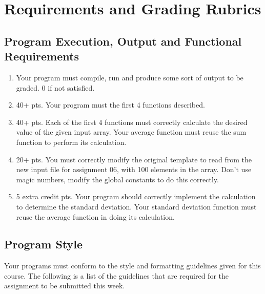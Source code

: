 \documentclass[11pt]{article}
\begin{document}
\section*{Requirements and Grading Rubrics}
\label{sec-5}

\subsection*{Program Execution, Output and Functional Requirements}
\label{sec-5-1}

\begin{enumerate}
\item Your program must compile, run and produce some sort of output to be
graded. 0 if not satisfied.
\item 40+ pts.  Your program must the first 4 functions described.
\item 40+ pts. Each of the first 4 functions must correctly calculate the desired
value of the given input array.  Your average function must reuse the sum
function to perform its calculation.
\item 20+ pts. You must correctly modify the original template to read from the new
input file for assignment 06, with 100 elements in the array.  Don't use
magic numbers, modify the global constants to do this correctly.
\item 5 extra credit pts. Your program should correctly implement the calculation to
determine the standard deviation.  Your standard deviation function must reuse
the average function in doing its calculation.
\end{enumerate}

\subsection*{Program Style}
\label{sec-5-2}

Your programs must conform to the style and formatting guidelines
given for this course.  The following is a list of the guidelines that
are required for the assignment to be submitted this week.
\end{document}
